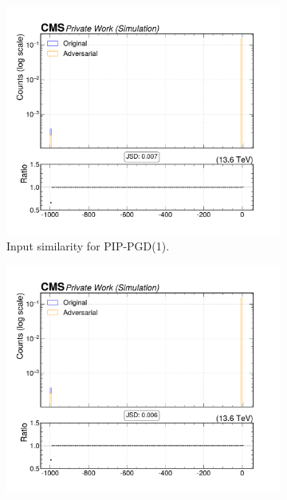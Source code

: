 \begin{figure}[htbp]
  \centering
  \begin{subfigure}[t]{0.32\textwidth}
    \includegraphics[width=\linewidth]{media/output/features/compare/combined_it_1/cmp_global_features_TagVarCSV_trackSip3dValAboveCharm.pdf}
    \caption*{Input similarity for PIP-PGD(1).}
  \end{subfigure}\hfill
  \begin{subfigure}[t]{0.32\textwidth}
    \includegraphics[width=\linewidth]{media/output/features/compare/combined_it_2/cmp_global_features_TagVarCSV_trackSip3dValAboveCharm.pdf}

\end{subfigure}
\end{figure}

